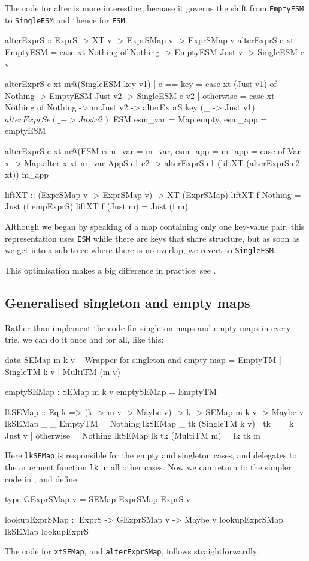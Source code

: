 \documentclass[acmsmall]{acmart}
\theoremstyle{theorem}
\theoremstyle{definition}
\theoremstyle{remark}
\begin{document}
The code for alter is more interesting, becuase it governs the shift from
\lstinline{EmptyESM} to \lstinline{SingleESM} and thence for \lstinline{ESM}:
\begin{code}
alterExprS  :: ExprS -> XT v -> ExprSMap v -> ExprSMap v
alterExprS e xt EmptyESM
  = case xt Nothing of
      Nothing -> EmptyESM
      Just v  -> SingleESM e v

alterExprS e xt m@(SingleESM key v1)
  | e == key
  = case xt (Just v1) of
      Nothing -> EmptyESM
      Just v2  -> SingleESM e v2
  | otherwise
  = case xt Nothing of
      Nothing -> m
      Just v2 -> alterExprS key (\_ -> Just v1) $
                 alterExprS e   (\_ -> Just v2) $
                 ESM { esm_var = Map.empty, esm_app = emptyESM }

alterExprS e xt m@(ESM { esm_var = m_var, esm_app = m_app }
  = case of
      Var x      -> Map.alter x xt m_var
      AppS e1 e2 -> alterExprS e1 (liftXT (alterExprS e2 xt)) m_app

liftXT :: (ExprSMap v -> ExprSMap v) -> XT (ExprSMap)
liftXT f Nothing  = Just (f empExprS)
liftXT f (Just m) = Just (f m)
\end{code}
Although we began by speaking of a map containing only one key-value pair,
this representation uses \lstinline{ESM} while there are keys that share structure,
but as soon as we get into a sub-treee where there is no overlap, we revert
to \lstinline{SingleESM}.

This optimisation makes a big difference in practice: see .

\subsection{Generalised singleton and empty maps} \label{sec:generalised}

Rather than implement the code for singleton maps and empty maps in every trie,
we can do it once and for all, like this:
\begin{code}
data SEMap m k v  -- Wrapper for singleton and empty map
  = EmptyTM | SingleTM k v | MultiTM (m v)

emptySEMap : SEMap m k v
emptySEMap = EmptyTM

lkSEMap :: Eq k => (k -> m v -> Maybe v) -> k -> SEMap m k v -> Maybe v
lkSEMap _  _  EmptyTM                    = Nothing
lkSEMap _  tk (SingleTM k v) | tk == k   = Just v
                             | otherwise = Nothing
lkSEMap lk tk (MultiTM m)                = lk tk m
\end{code}
Here \lstinline{lkSEMap} is responsible for the empty and singleton
cases, and delegates to the arugment function \lstinline{lk} in all other cases.
Now we can return to the simpler code in , and define
\begin{code}
type GExprSMap v = SEMap ExprSMap ExprS v

lookupExprSMap :: ExprS -> GExprSMap v -> Maybe v
lookupExprSMap = lkSEMap lookupExprS
\end{code}
The code for \lstinline{xtSEMap}, and \lstinline{alterExprSMap}, follows straightforwardly.
\end{document}
